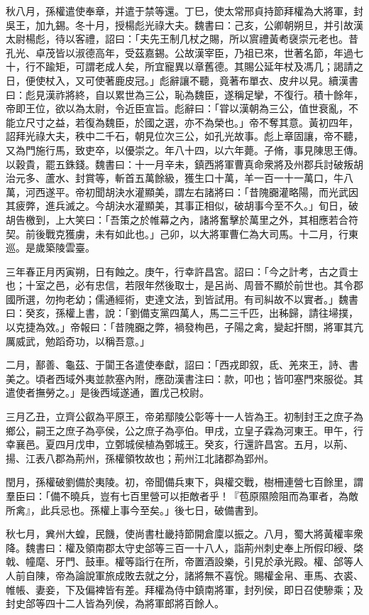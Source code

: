 \begin{pinyinscope}
秋八月，孫權遣使奉章，并遣于禁等還。丁巳，使太常邢貞持節拜權為大將軍，封吳王，加九錫。冬十月，授楊彪光祿大夫。魏書曰：己亥，公卿朝朔旦，并引故漢太尉楊彪，待以客禮，詔曰：「夫先王制几杖之賜，所以賔禮黃耇襃崇元老也。昔孔光、卓茂皆以淑德高年，受茲嘉錫。公故漢宰臣，乃祖已來，世著名節，年過七十，行不踰矩，可謂老成人矣，所宜寵異以章舊德。其賜公延年杖及馮几；謁請之日，便使杖入，又可使著鹿皮冠。」彪辭讓不聽，竟著布單衣、皮弁以見。續漢書曰：彪見漢祚將終，自以累世為三公，恥為魏臣，遂稱足攣，不復行。積十餘年，帝即王位，欲以為太尉，令近臣宣旨。彪辭曰：「甞以漢朝為三公，值世衰亂，不能立尺寸之益，若復為魏臣，於國之選，亦不為榮也。」帝不奪其意。黃初四年，詔拜光祿大夫，秩中二千石，朝見位次三公，如孔光故事。彪上章固讓，帝不聽，又為門施行馬，致吏卒，以優崇之。年八十四，以六年薨。子脩，事見陳思王傳。以穀貴，罷五銖錢。魏書曰：十一月辛未，鎮西將軍曹真命衆將及州郡兵討破叛胡治元多、蘆水、封賞等，斬首五萬餘級，獲生口十萬，羊一百一十一萬口，牛八萬，河西遂平。帝初聞胡決水灌顯美，謂左右諸將曰：「昔隗嚻灌略陽，而光武因其疲弊，進兵滅之。今胡決水灌顯美，其事正相似，破胡事今至不久。」旬日，破胡告檄到，上大笑曰：「吾策之於帷幕之內，諸將奮擊於萬里之外，其相應若合符契。前後戰克獲虜，未有如此也。」己卯，以大將軍曹仁為大司馬。十二月，行東巡。是歲築陵雲臺。

三年春正月丙寅朔，日有蝕之。庚午，行幸許昌宮。詔曰：「今之計考，古之貢士也；十室之邑，必有忠信，若限年然後取士，是呂尚、周晉不顯於前世也。其令郡國所選，勿拘老幼；儒通經術，吏達文法，到皆試用。有司糾故不以實者。」魏書曰：癸亥，孫權上書，說：「劉備支黨四萬人，馬二三千匹，出秭歸，請往埽撲，以克捷為效。」帝報曰：「昔隗嚻之弊，禍發栒邑，子陽之禽，變起扞關，將軍其亢厲威武，勉蹈奇功，以稱吾意。」

二月，鄯善、龜茲、于闐王各遣使奉獻，詔曰：「西戎即叙，氐、羌來王，詩、書美之。頃者西域外夷並款塞內附，應劭漢書注曰：款，叩也；皆叩塞門來服從。其遣使者撫勞之。」是後西域遂通，置戊己校尉。

三月乙丑，立齊公叡為平原王，帝弟鄢陵公彰等十一人皆為王。初制封王之庶子為鄉公，嗣王之庶子為亭侯，公之庶子為亭伯。甲戌，立皇子霖為河東王。甲午，行幸襄邑。夏四月戊申，立鄄城侯植為鄄城王。癸亥，行還許昌宮。五月，以荊、揚、江表八郡為荊州，孫權領牧故也；荊州江北諸郡為郢州。

閏月，孫權破劉備於夷陵。初，帝聞備兵東下，與權交戰，樹柵連營七百餘里，謂羣臣曰：「備不曉兵，豈有七百里營可以拒敵者乎！『苞原隰險阻而為軍者，為敵所禽』，此兵忌也。孫權上事今至矣。」後七日，破備書到。

秋七月，兾州大蝗，民饑，使尚書杜畿持節開倉廩以振之。八月，蜀大將黃權率衆降。魏書曰：權及領南郡太守史郃等三百一十八人，詣荊州刺史奉上所假印綬、棨戟、幢麾、牙門、鼓車。權等詣行在所，帝置酒設樂，引見於承光殿。權、郃等人人前自陳，帝為論說軍旅成敗去就之分，諸將無不喜恱。賜權金帛、車馬、衣裘、帷帳、妻妾，下及偏裨皆有差。拜權為侍中鎮南將軍，封列侯，即日召使驂乘；及封史郃等四十二人皆為列侯，為將軍郎將百餘人。


\end{pinyinscope}
